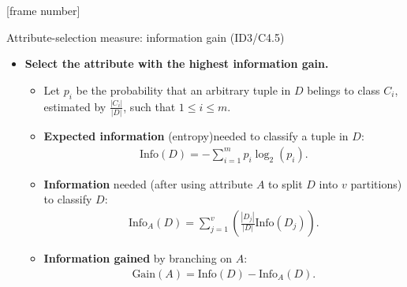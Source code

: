 \documentclass[aspectratio=169,t,table]{beamer}
\begin{document}
  {
    [frame number]
    \begin{frame}{Attribute-selection measure: information gain (ID3/C4.5)}
      \begin{itemize}
        \item \textbf{Select the attribute with the highest information gain.}
        \begin{itemize}
          \item Let $p_i$ be the probability that an arbitrary tuple in $D$ belings to class $C_i$,\\ estimated by $\frac{|C_i|}{|D|}$, such that $1 \leq i \leq m$.
          \item \textbf{Expected information} (entropy)needed to classify a tuple in $D$:
          \begin{align}
            \text{Info}(D) = -\sum_{i=1}^{m}p_i \log_2(p_i).
          \end{align}
          \item \textbf{Information} needed (after using attribute $A$ to split $D$ into $v$ partitions) to classify $D$:
          \begin{align}
            \text{Info}_A(D) = \sum_{j=1}^v \left( \frac{|D_j|}{|D|} \text{Info}(D_j) \right).
          \end{align}
          \item \textbf{Information gained} by branching on $A$:
          \begin{align}
            \text{Gain}(A)=\text{Info}(D)-\text{Info}_A(D).
          \end{align}
        \end{itemize}
      \end{itemize}
    \end{frame}
  }
\end{document}
